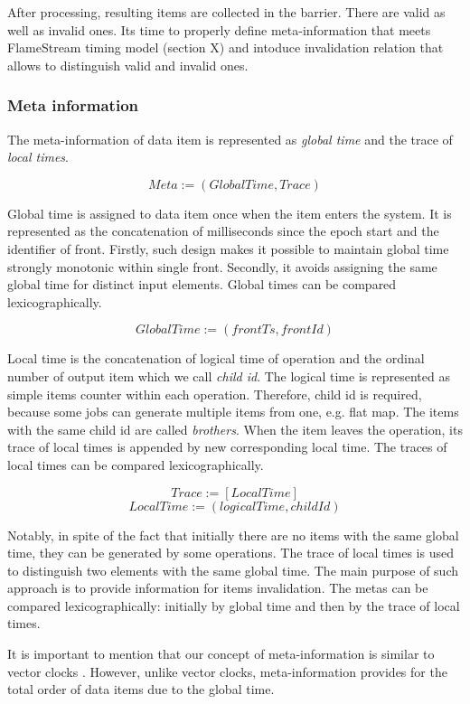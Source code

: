 \label {fs-barrier}

After processing, resulting items are collected in the barrier. There are valid as well as invalid ones. Its time to properly define meta-information that meets FlameStream timing model (section X) and intoduce invalidation relation that allows to distinguish valid and invalid ones.

\subsubsection{Meta information}
The meta-information of data item is represented as {\it global time} and the trace of {\it local times}.

\[Meta := (GlobalTime, Trace)\]

Global time is assigned to data item once when the item enters the system. It is represented as the concatenation of milliseconds since the epoch start and the identifier of front. Firstly, such design makes it possible to maintain global time strongly monotonic within single front. Secondly, it avoids assigning the same global time for distinct input elements. Global times can be compared lexicographically.

\[GlobalTime := (frontTs, frontId)\]

Local time is the concatenation of logical time of operation and the ordinal number of output item which we call {\it child id}. The logical time is represented as simple items counter within each operation. Therefore, child id is required, because some jobs can generate multiple items from one, e.g. flat map. The items with the same child id are called {\it brothers}. When the item leaves the operation, its trace of local times is appended by new corresponding local time. The traces of local times can be compared lexicographically.

\[Trace := [LocalTime]\]
\[LocalTime := (logicalTime, childId)\]

Notably, in spite of the fact that initially there are no items with the same global time, they can be generated by some operations. The trace of local times is used to distinguish two elements with the same global time. The main purpose of such approach is to provide information for items invalidation. The metas can be compared lexicographically: initially by global time and then by the trace of local times. 

It is important to mention that our concept of meta-information is similar to vector clocks
\cite{fidge1988timestamps, mattern88virtualtime}. However, unlike vector clocks, meta-information provides for the total order of data items due to the global time.

